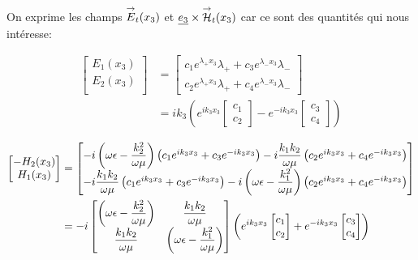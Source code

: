On exprime les champs ${\overset{\rightarrow}{E}}_t(x_3)$ et $\underline{e_3} \times {\overset{\rightarrow}{\mathcal{H}}}_t(x_3)$ car ce sont des quantités qui nous intéresse:

\begin{align}
    \begin{bmatrix}
        E_1(x_3)\\
        E_2(x_3)\\
    \end{bmatrix}
    &=
    \begin{bmatrix}
        c_1 e^{\lambda_+ x_3} \lambda_{+} + c_3 e^{\lambda_- x_3} \lambda_{-} \\
        c_2 e^{\lambda_+ x_3} \lambda_{+} + c_4 e^{\lambda_- x_3} \lambda_{-}
    \end{bmatrix}\\
    &=ik_3\left( e^{ik_3 x_3}
    \begin{bmatrix}
        c_1 \\
        c_2
    \end{bmatrix}
    -e^{-ik_3 x_3}
    \begin{bmatrix}
        c_3 \\
        c_4
    \end{bmatrix}
    \right)
    \label{eq:imp_fourier:plan:generale_E}
\end{align}

\begin{align}
    \begin{bmatrix}
        -H_2(x_3)\\
        H_1(x_3)\\
    \end{bmatrix}
    &=
    \begin{bmatrix}
        -i\left(\omega\epsilon - \dfrac{k_2^2}{\omega\mu}\right) \left( c_1 e^{ik_3 x_3} + c_3 e^{-ik_3 x_3} \right) - i\dfrac{k_1k_2}{\omega\mu} \left( c_2 e^{ik_3 x_3} + c_4 e^{-ik_3 x_3} \right)
        \\
        -i\dfrac{k_1k_2}{\omega\mu} \left( c_1 e^{ik_3 x_3} + c_3 e^{-ik_3 x_3} \right) - i\left(\omega\epsilon - \dfrac{k_1^2}{\omega\mu}\right)\left( c_2 e^{ik_3 x_3} + c_4 e^{-ik_3 x_3} \right)
    \end{bmatrix} \\
    &=-i
    \begin{bmatrix}
    \left(\omega\epsilon - \dfrac{k_2^2}{\omega\mu}\right) & \dfrac{k_1k_2}{\omega\mu}
    \\
    \dfrac{k_1k_2}{\omega\mu} & \left(\omega\epsilon - \dfrac{k_1^2}{\omega\mu}\right) 
    \end{bmatrix}
    \left(
        e^{ik_3 x_3}
        \begin{bmatrix}
            c_1 \\
            c_2
        \end{bmatrix}
        +e^{-ik_3 x_3}
        \begin{bmatrix}
            c_3 \\
            c_4
        \end{bmatrix}
    \right)
    \label{eq:imp_fourier:plan:generale_H}
\end{align}

